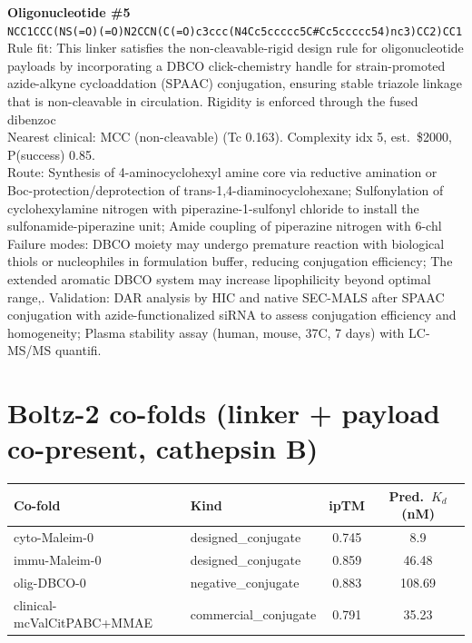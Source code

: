 \documentclass[10pt]{article}
\begin{document}
\noindent\textbf{Oligonucleotide \#5} \\ \texttt{NCC1CCC(NS(=O)(=O)N2CCN(C(=O)c3ccc(N4Cc5ccccc5C\#Cc5ccccc54)nc3)CC2)CC1} \\ Rule fit: This linker satisfies the non-cleavable-rigid design rule for oligonucleotide payloads by incorporating a DBCO click-chemistry handle for strain-promoted azide-alkyne cycloaddation (SPAAC) conjugation, ensuring stable triazole linkage that is non-cleavable in circulation. Rigidity is enforced through the fused dibenzoc \\ Nearest clinical: MCC (non-cleavable) (Tc 0.163). Complexity idx 5, est.\ \$2000, P(success) 0.85. \\ Route: Synthesis of 4-aminocyclohexyl amine core via reductive amination or Boc-protection/deprotection of trans-1,4-diaminocyclohexane; Sulfonylation of cyclohexylamine nitrogen with piperazine-1-sulfonyl chloride to install the sulfonamide-piperazine unit; Amide coupling of piperazine nitrogen with 6-chl \\ Failure modes: DBCO moiety may undergo premature reaction with biological thiols or nucleophiles in formulation buffer, reducing conjugation efficiency; The extended aromatic DBCO system may increase lipophilicity beyond optimal range,. Validation: DAR analysis by HIC and native SEC-MALS after SPAAC conjugation with azide-functionalized siRNA to assess conjugation efficiency and homogeneity; Plasma stability assay (human, mouse, 37\textdegree{}C, 7 days) with LC-MS/MS quantifi. \\[0.4em]
\section{Boltz-2 co-folds (linker + payload co-present, cathepsin B)}
\begin{table}[h]\centering\small\begin{tabular}{l l c c}\toprule Co-fold & Kind & ipTM & Pred.\ $K_d$ (nM) \\ \midrule cyto-Maleim-0 & designed\_conjugate & 0.745 & 8.9 \\
immu-Maleim-0 & designed\_conjugate & 0.859 & 46.48 \\
olig-DBCO-0 & negative\_conjugate & 0.883 & 108.69 \\
clinical-mcValCitPABC+MMAE & commercial\_conjugate & 0.791 & 35.23 \\ \bottomrule\end{tabular}\end{table}
\end{document}

